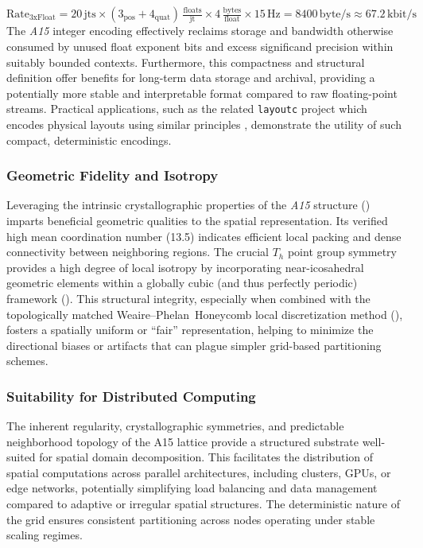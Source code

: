 \documentclass[10pt]{article}
\def\AAAB{\textit{A15}}
\def\WP{Weaire--Phelan}
\def\WPH{\WP{}~Honeycomb}
\begin{document}
\begin{equation} \label{eq-bandwidth-baseline}
    \text{Rate}_{\text{3xFloat}} = 20\,\text{jts} \times (3_{\text{pos}} + 4_{\text{quat}})\,\tfrac{\text{floats}}{\text{jt}} \times 4\,\tfrac{\text{bytes}}{\text{float}} \times 15\,\text{Hz} = 8400\,\text{byte/s} \approx 67.2\,\text{kbit/s}
\end{equation}
The \AAAB{} integer encoding effectively reclaims storage and bandwidth otherwise consumed by unused float exponent bits and excess significand precision within suitably bounded contexts. Furthermore, this compactness and structural definition offer benefits for long-term data storage and archival, providing a potentially more stable and interpretable format compared to raw floating-point streams. Practical applications, such as the related \texttt{layoutc} project which encodes physical layouts using similar principles \cite{Risinger2024Layoutc}, demonstrate the utility of such compact, deterministic encodings.

\subsubsection{Geometric Fidelity and Isotropy}\label{subsubsec-benefits-geometry}
Leveraging the intrinsic crystallographic properties of the \AAAB{} structure () imparts beneficial geometric qualities to the spatial representation. Its verified high mean coordination number (13.5) indicates efficient local packing and dense connectivity between neighboring regions. The crucial $T_h$ point group symmetry provides a high degree of local isotropy by incorporating near-icosahedral geometric elements within a globally cubic (and thus perfectly periodic) framework (). This structural integrity, especially when combined with the topologically matched \WPH{} local discretization method (), fosters a spatially uniform or ``fair'' representation, helping to minimize the directional biases or artifacts that can plague simpler grid-based partitioning schemes.

\subsubsection{Suitability for Distributed Computing}\label{subsubsec-benefits-parallelism}
The inherent regularity, crystallographic symmetries, and predictable neighborhood topology of the A15 lattice provide a structured substrate well-suited for spatial domain decomposition. This facilitates the distribution of spatial computations across parallel architectures, including clusters, GPUs, or edge networks, potentially simplifying load balancing and data management compared to adaptive or irregular spatial structures. The deterministic nature of the grid ensures consistent partitioning across nodes operating under stable scaling regimes.
\end{document}
